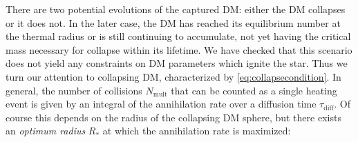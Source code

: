 \documentclass[preprintnumbers,amsmath,amssymb,prd,superscriptaddress]{revtex4}
\def\r{\right)}
\def\l{\left(}
\begin{document}
There are two potential evolutions of the captured DM: either the DM collapses or it does not. 
In the later case, the DM has reached its equilibrium number at the thermal radius or is still continuing to accumulate, not yet having the critical mass necessary for collapse within its lifetime.
We have checked that this scenario does not yield any constraints on DM parameters which ignite the star. 
Thus we turn our attention to collapsing DM, characterized by \eqref{eq:collapsecondition}. 
In general, the number of collisions $N_\text{mult}$ that can be counted as a single heating event is given by an integral of the annihilation rate over a diffusion time $\tau_\text{diff}$.
Of course this depends on the radius of the collapsing DM sphere, but there exists an \emph{optimum radius} $R_*$ at which the annihilation rate is maximized:
\end{document}
